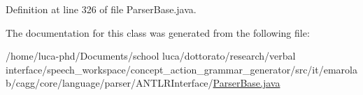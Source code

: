 Definition at line 326 of file Parser\-Base.\-java.



The documentation for this class was generated from the following file\-:\begin{DoxyCompactItemize}
\item 
/home/luca-\/phd/\-Documents/school luca/dottorato/research/verbal interface/speech\-\_\-workspace/concept\-\_\-action\-\_\-grammar\-\_\-generator/src/it/emarolab/cagg/core/language/parser/\-A\-N\-T\-L\-R\-Interface/\hyperlink{ParserBase_8java}{Parser\-Base.\-java}\end{DoxyCompactItemize}
